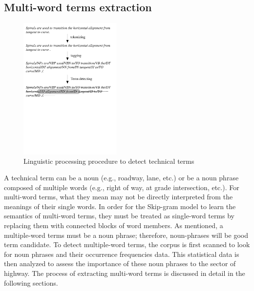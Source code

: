 \documentclass[Journal,InsideFigs, DoubleSpace]{ascelike} %
\begin{document}
\subsection{Multi-word terms extraction}
%
\begin{figure}[t]
	\centering
	\includegraphics[width=0.45\textwidth]{Figure2_term_extraction}
	\caption{Linguistic processing procedure to detect technical terms}
	\label{fig:np_detect}
\end{figure}
%
A technical term can be a noun (e.g., roadway, lane, etc.) or be a noun phrase composed of multiple words (e.g., right of way, at grade intersection, etc.). For multi-word terms, what they mean may not be directly interpreted from the meanings of their single words. In order for the Skip-gram model to learn the semantics of multi-word terms, they must be treated as single-word terms by replacing them with connected blocks of word members. As mentioned, a multiple-word terms must be a noun phrase; therefore, noun-phrases will be good term candidate. To detect multiple-word terms, the corpus is first scanned to look for noun phrases and their occurrence frequencies data. This statistical data is then analyzed to assess the importance of these noun phrases to the sector of highway. The process of extracting multi-word terms is discussed in detail in the following sections.  %
\end{document}
